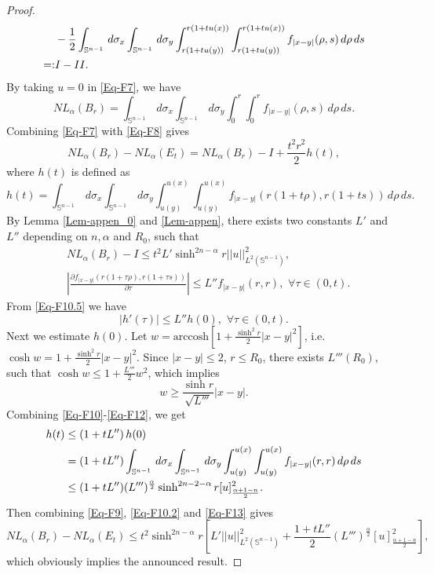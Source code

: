 \documentclass[11pt,reqno]{amsart}
\theoremstyle{definition}
\theoremstyle{remark}
\numberwithin{equation}{section}
\renewcommand{\(}{\left(}
\renewcommand{\)}{\right)}
\renewcommand{\-}{\overline}
\begin{document}
\begin{proof}
\begin{align}
	&-\frac{1}{2}\int_{\mathbb{S}^{n-1}}\,d\sigma_x\int_{\mathbb{S}^{n-1}}\,d\sigma_y\int_{r(1+tu(y))}^{r(1+tu(x))}\int_{r(1+tu(y))}^{r(1+tu(x))}{f_{|x-y|}(\rho,s)}\,d\rho\,ds\notag\\
	=:&I-II.\label{Eq-F7}
\end{align}
By taking $u=0$ in \eqref{Eq-F7}, we have
\begin{equation}\label{Eq-F8}
	NL_{\alpha}(B_r)=\int_{\mathbb{S}^{n-1}}\,d\sigma_x\int_{\mathbb{S}^{n-1}}\,d\sigma_y\int_0^{r}\int_0^{r}{f_{|x-y|}(\rho,s)}\,d\rho\,ds.
\end{equation}
Combining \eqref{Eq-F7} with \eqref{Eq-F8} gives
\begin{equation}\label{Eq-F9}
		NL_{\alpha}(B_r)-NL_{\alpha}(E_t)=NL_{\alpha}(B_r)-I+\frac{t^2 r^2}{2}h(t),
\end{equation}
where $h(t)$ is defined as 
\begin{equation}\label{Eq-F10}
	h(t)=\int_{\mathbb{S}^{n-1}}\,d\sigma_x\int_{\mathbb{S}^{n-1}}\,d\sigma_y\int_{u(y)}^{u(x)}\int_{u(y)}^{u(x)}{f_{|x-y|}(r(1+t\rho),r(1+ts))}\,d\rho\,ds.
\end{equation}
By Lemma \ref{Lem-appen_0} and \ref{Lem-appen}, there exists two constants $L'$ and $L''$ depending on $n,\alpha$ and $R_0$, such that  
\begin{align}
	&NL_{\alpha}(B_r)-I\leq t^2L' \sinh^{2n-\alpha}r||u||^2_{L^2(\mathbb{S}^{n-1})},\label{Eq-F10.2}\\
	&\left|\frac{\partial f_{|x-y|}(r(1+\tau\rho),r(1+\tau s))}{\partial\tau}\right|\leq L''f_{|x-y|}(r,r),\,\,\forall\tau\in(0,t)\label{Eq-F10.5}.
\end{align}
From \eqref{Eq-F10.5} we have
\begin{equation}\label{Eq-F11}
	|h'(\tau)|\leq L''h(0),\,\,\forall\tau\in(0,t).
\end{equation}
Next we estimate $h(0)$. Let $w=\mathrm{arccosh}\left[1+\frac{\sinh^2 r}{2}|x-y|^2\right]$, i.e. $\cosh w=1+\frac{\sinh^2 r}{2}|x-y|^2$. Since $|x-y|\leq 2$, $r\leq R_0$, there exists $L'''(R_0)$, such that $\cosh w\leq 1+\frac{L'''}{2}w^2$, which implies
\begin{equation}\label{Eq-F12}
	w\geq\frac{\sinh r}{\sqrt{L'''}}|x-y|.
\end{equation}
Combining \eqref{Eq-F10}-\eqref{Eq-F12}, we get
\begin{align}
	h(t)&\leq \left(1+tL''\right)h(0)\notag\\
	&=(1+tL'')\int_{\mathbb{S}^{n-1}}\,d\sigma_x\int_{\mathbb{S}^{n-1}}\,d\sigma_y\int_{u(y)}^{u(x)}\int_{u(y)}^{u(x)}{f_{|x-y|}(r,r)}\,d\rho\,ds\notag\\
	&\leq (1+tL'')(L''')^{\frac{\alpha}{2}}\sinh^{2n-2-\alpha} r [u]^2_{\frac{\alpha+1-n}{2}}.\label{Eq-F13}
\end{align}
Then combining \eqref{Eq-F9}, \eqref{Eq-F10.2} and \eqref{Eq-F13} gives
\begin{equation}
	NL_{\alpha}(B_r)-NL_{\alpha}(E_t)\leq t^2\sinh^{2n-\alpha} r\left[L'||u||^2_{L^2(\mathbb{S}^{n-1})}+\frac{1+tL''}{2}(L''')^{\frac{\alpha}{2}}[u]^2_{\frac{\alpha+1-n}{2}}\right],
\end{equation}
which obviously implies the announced result.
\end{proof}
\end{document}
